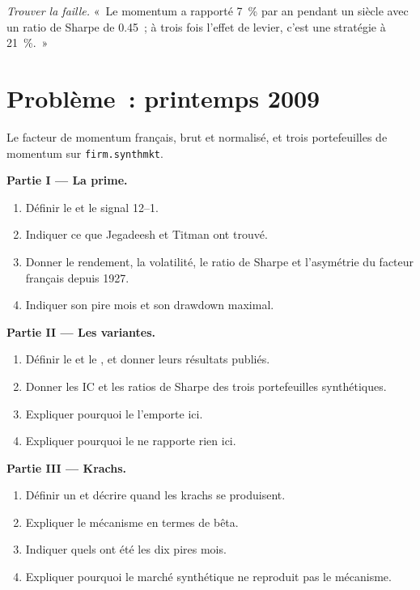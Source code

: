 \begin{exercise}[$\star\star\star$]\label{exo:s1:momentum:8}
\emph{Trouver la faille.} «~Le momentum a rapporté 7~\% par an pendant un siècle avec un ratio de Sharpe de 0.45~; à trois fois l'effet de levier, c'est une stratégie à 21~\%.~»
\end{exercise}

\section{Problème~: printemps 2009}

\begin{problem}\label{pb:s1:momentum:1}
Le facteur de momentum français, brut et normalisé, et trois portefeuilles de momentum sur \texttt{firm.synthmkt}.

\medskip\noindent\textbf{Partie I --- La prime.}
\begin{enumerate}
\item Définir le  et le signal 12--1.
\item Indiquer ce que Jegadeesh et Titman ont trouvé.
\item Donner le rendement, la volatilité, le ratio de Sharpe et l'asymétrie du facteur français depuis 1927.
\item Indiquer son pire mois et son drawdown maximal.
\end{enumerate}

\medskip\noindent\textbf{Partie II --- Les variantes.}
\begin{enumerate}[resume]
\item Définir le  et le , et donner leurs résultats publiés.
\item Donner les IC et les ratios de Sharpe des trois portefeuilles synthétiques.
\item Expliquer pourquoi le  l'emporte ici.
\item Expliquer pourquoi le  ne rapporte rien ici.
\end{enumerate}

\medskip\noindent\textbf{Partie III --- Krachs.}
\begin{enumerate}[resume]
\item Définir un  et décrire quand les krachs se produisent.
\item Expliquer le mécanisme en termes de bêta.
\item Indiquer quels ont été les dix pires mois.
\item Expliquer pourquoi le marché synthétique ne reproduit pas le mécanisme.
\end{enumerate}


\end{problem}
